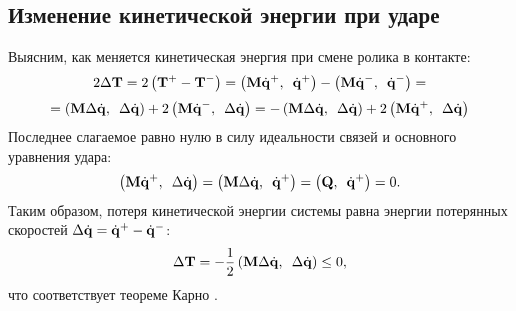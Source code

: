 
\subsection{Изменение кинетической энергии при ударе}
Выясним, как меняется кинетическая энергия при смене ролика в контакте:
$$
2\Delta\ke  =  2\left(\ke^+ - \ke^-\right) = \dotp{\mke\dqposle}{\dqposle} - \dotp{\mke\dqdo}{\dqdo} =
$$
$$
= \dotp{\mke\deltadq}{\deltadq} + 2\dotp{\mke\dqdo}{\deltadq} = -\dotp{\mke\deltadq}{\deltadq} + 2\dotp{\mke\dqposle}{\deltadq}
$$
Последнее слагаемое равно нулю в силу идеальности связей и основного уравнения удара:
$$\logicWorkZero.$$
Таким образом, потеря кинетической энергии системы равна энергии потерянных скоростей $\deltadq = \dqposle - \dqdo$:
\begin{equation*}
\eqDeltaT,
\end{equation*}
что соответствует теореме Карно \cite{Vilke}.
